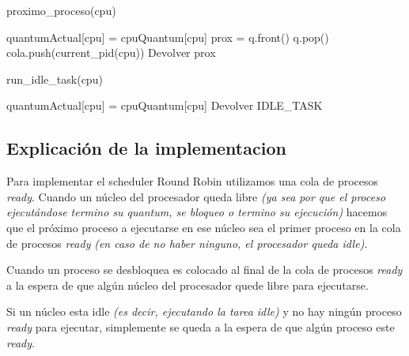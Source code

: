 \begin{algorithm}[H]
\caption{proximo\_proceso(cpu)}
\label{pseudo:proximoproceso}
\begin{algorithmic}

\STATE quantumActual[cpu] = cpuQuantum[cpu]
\STATE prox = q.front()
\STATE q.pop()
	\STATE cola.push(current\_pid(cpu))
\ENDIF
\STATE Devolver prox

\end{algorithmic}
\end{algorithm}


\begin{algorithm}[H]
\caption{run\_idle\_task(cpu)}
\label{pseudo:runidletask}
\begin{algorithmic}

\STATE quantumActual[cpu] = cpuQuantum[cpu]
\STATE Devolver IDLE\_TASK

\end{algorithmic}
\end{algorithm}


\subsection{Explicación de la implementacion}

Para implementar el scheduler Round Robin utilizamos una cola de procesos \textit{ready}. Cuando un núcleo del procesador queda libre \textit{(ya sea por que el proceso ejecutándose termino su quantum, se bloqueo o termino su ejecución)} hacemos que el próximo proceso a ejecutarse en ese núcleo sea el primer proceso en la cola de procesos \textit{ready} \textit{(en caso de no haber ninguno, el procesador queda idle)}.

Cuando un proceso se desbloquea es colocado al final de la cola de procesos \textit{ready} a la espera de que algún núcleo del procesador quede libre para ejecutarse.

Si un núcleo esta idle \textit{(es decir, ejecutando la tarea idle)} y no hay ningún proceso \textit{ready} para ejecutar, simplemente se queda a la espera de que algún proceso este \textit{ready}.

